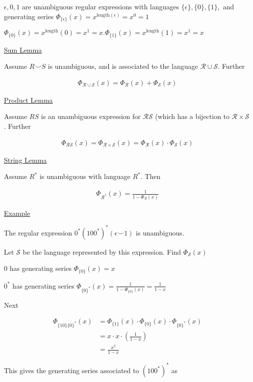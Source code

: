 \documentclass{article}
\newcommand\mc{\mathcal}
\begin{document}
$\epsilon, 0, 1$ are unambiguous regular expressions with languages $\{\epsilon\}, \{0\},\{1\},$ and generating series $\Phi_{\{\epsilon\}}(x) = x^{\text{length}(\epsilon)} = x^0 = 1$

$\Phi_{\{0\}}(x) = x^\text{length}(0) = x^1 = x. \Phi_{\{1\}}(x) = x^\text{length}(1) = x^1 = x$

\underline{Sum Lemma}

Assume $R \smile S$ is unambiguous, and is associated to the language $\mc{R} \cup \mc{S}$. Further

\begin{align*}
    \Phi_{\mc{R} \cup \mc{S}}(x) = \Phi_{\mc{R}}(x) + \Phi_{\mc{S}}(x)
\end{align*}

\underline{Product Lemma}

Assume $RS$ is an unambiguous expression for $\mc{RS}$ (which has a bijection to $\mc{R} \times \mc{S}$. Further

\begin{align*}
    \Phi_{\mc{RS}}(x) = \Phi_{\mc{R} \times \mc{S}}(x) = \Phi_{\mc{R}}(x) \cdot \Phi_{\mc{S}}(x)
\end{align*}


\underline{String Lemma}

Assume $R^*$ is unambiguous with language $R^*$. Then

\begin{align*}
    \Phi_{\mc{R}^*}(x) = \frac{1}{1-\Phi_{\mc{R}}(x)}
\end{align*}

\underline{Example}

The regular expression $0^*(100^*)^*(\epsilon \smile 1)$ is unambiguous.

Let $\mc{S}$ be the language represented by this expression. Find $\Phi_{\mc{S}}(x)$

$0$ has generating series $\Phi_{\{0\}}(x) = x$

$0^*$ has generating series $\Phi_{\{0\}^*}(x) = \frac{1}{1-\Phi_{\{0\}}(x)} = \frac{1}{1-x}$

Next 

\begin{align*}
    \Phi_{\{10\}\{0\}^*}(x) &= \Phi_{\{1\}}(x) \cdot \Phi_{\{0\}}(x) \cdot \Phi_{\{0\}^*}(x) \\
    &= x \cdot x \cdot (\frac{1}{1-x}) \\
    &= \frac{x^2}{1-x}
\end{align*}

This gives the generating series associated to $(100^*)^*$ as
\end{document}
